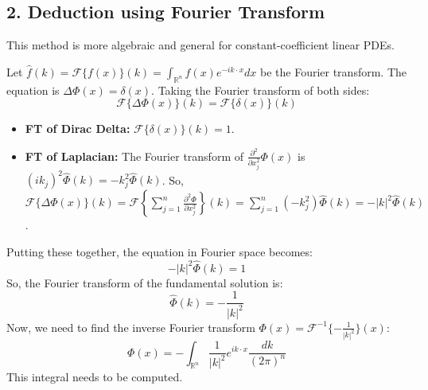 \subsection{2. Deduction using Fourier Transform}

This method is more algebraic and general for constant-coefficient linear PDEs.

Let $\widehat{f}(k) = \mathcal{F}\{f(x)\}(k) = \int_{\mathbb{R}^n} f(x) e^{-i k \cdot x} dx$ be the Fourier transform.
The equation is $\Delta \Phi(x) = \delta(x)$.
Taking the Fourier transform of both sides:
\[
\mathcal{F}\{\Delta \Phi(x)\}(k) = \mathcal{F}\{\delta(x)\}(k)
\]
\begin{itemize}
	\item \textbf{FT of Dirac Delta:} $\mathcal{F}\{\delta(x)\}(k) = 1$.
	\item \textbf{FT of Laplacian:} The Fourier transform of $\frac{\partial^2}{\partial x_j^2} \Phi(x)$ is $(i k_j)^2 \widehat{\Phi}(k) = -k_j^2 \widehat{\Phi}(k)$.
So, $\mathcal{F}\{\Delta \Phi(x)\}(k) = \mathcal{F}\left\{\sum_{j=1}^n \frac{\partial^2 \Phi}{\partial x_j^2}\right\}(k) = \sum_{j=1}^n (-k_j^2) \widehat{\Phi}(k) = -|k|^2 \widehat{\Phi}(k)$.
\end{itemize}

Putting these together, the equation in Fourier space becomes:
\[
-|k|^2 \widehat{\Phi}(k) = 1
\]
So, the Fourier transform of the fundamental solution is:
\[
\widehat{\Phi}(k) = -\frac{1}{|k|^2}
\]
Now, we need to find the inverse Fourier transform $\Phi(x) = \mathcal{F}^{-1}\{-\frac{1}{|k|^2}\}(x)$:
\[
\Phi(x) = -\int_{\mathbb{R}^n} \frac{1}{|k|^2} e^{i k \cdot x} \frac{dk}{(2\pi)^n}
\]
This integral needs to be computed.

